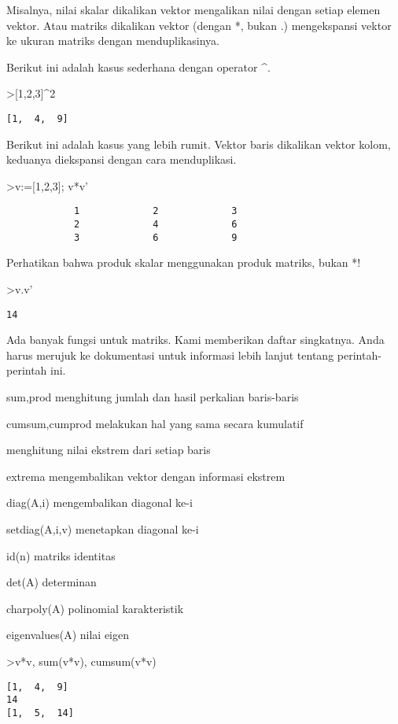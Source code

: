 \documentclass[
]{book}
\begin{document}
Misalnya, nilai skalar dikalikan vektor mengalikan nilai dengan setiap elemen vektor. Atau matriks dikalikan vektor (dengan *, bukan .) mengekspansi vektor ke ukuran matriks dengan menduplikasinya.

Berikut ini adalah kasus sederhana dengan operator \^{}.

\textgreater{[}1,2,3{]}\^{}2

\begin{verbatim}
[1,  4,  9]
\end{verbatim}

Berikut ini adalah kasus yang lebih rumit. Vektor baris dikalikan vektor kolom, keduanya diekspansi dengan cara menduplikasi.

\textgreater v:={[}1,2,3{]}; v*v'

\begin{verbatim}
            1             2             3 
            2             4             6 
            3             6             9 
\end{verbatim}

Perhatikan bahwa produk skalar menggunakan produk matriks, bukan *!

\textgreater v.v'

\begin{verbatim}
14
\end{verbatim}

Ada banyak fungsi untuk matriks. Kami memberikan daftar singkatnya. Anda harus merujuk ke dokumentasi untuk informasi lebih lanjut tentang perintah-perintah ini.

sum,prod menghitung jumlah dan hasil perkalian baris-baris

cumsum,cumprod melakukan hal yang sama secara kumulatif

menghitung nilai ekstrem dari setiap baris

extrema mengembalikan vektor dengan informasi ekstrem

diag(A,i) mengembalikan diagonal ke-i

setdiag(A,i,v) menetapkan diagonal ke-i

id(n) matriks identitas

det(A) determinan

charpoly(A) polinomial karakteristik

eigenvalues(A) nilai eigen

\textgreater v*v, sum(v*v), cumsum(v*v)

\begin{verbatim}
[1,  4,  9]
14
[1,  5,  14]
\end{verbatim}
\end{document}
